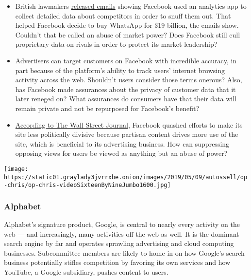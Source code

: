 \begin{itemize}
\item
  British lawmakers
  \href{https://www.nytimes3xbfgragh.onion/2018/12/05/technology/facebook-emails-privacy-data.html}{released
  emails} showing Facebook used an analytics app to collect detailed
  data about competitors in order to snuff them out. That helped
  Facebook decide to buy WhatsApp for \$19 billion, the emails show.
  Couldn't that be called an abuse of market power? Does Facebook still
  cull proprietary data on rivals in order to protect its market
  leadership?
\item
  Advertisers can target customers on Facebook with incredible accuracy,
  in part because of the platform's ability to track users' internet
  browsing activity across the web. Shouldn't users consider those terms
  onerous? Also, has Facebook made assurances about the privacy of
  customer data that it later reneged on? What assurances do consumers
  have that their data will remain private and not be repurposed for
  Facebook's benefit?
\end{itemize}

\begin{itemize}
\tightlist
\item
  \href{https://www.wsj.com/articles/facebook-knows-it-encourages-division-top-executives-nixed-solutions-11590507499}{According
  to The Wall Street Journal}, Facebook quashed efforts to make its site
  less politically divisive because partisan content drives more use of
  the site, which is beneficial to its advertising business. How can
  suppressing opposing views for users be viewed as anything but an
  abuse of power?
\end{itemize}

\texttt{[image: https://static01.graylady3jvrrxbe.onion/images/2019/05/09/autossell/op-chris/op-chris-videoSixteenByNineJumbo1600.jpg]}

\hypertarget{alphabet}{%
\subsubsection{Alphabet}\label{alphabet}}

Alphabet's signature product, Google, is central to nearly every
activity on the web --- and increasingly, many activities off the web as
well. It is the dominant search engine by far and operates sprawling
advertising and cloud computing businesses. Subcommittee members are
likely to home in on how Google's search business potentially stifles
competition by favoring its own services and how YouTube, a Google
subsidiary, pushes content to users.


